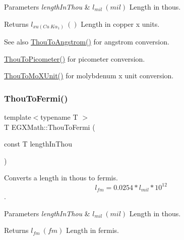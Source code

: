\begin{DoxyParams}{Parameters}
{\em length\+In\+Thou} & $ l_{mil}\ (mil)$ Length in thous. \\
\hline
\end{DoxyParams}
\begin{DoxyReturn}{Returns}
$ l_{xu(Cu\ K\alpha_1)}\ ()$ Length in copper x units. 
\end{DoxyReturn}
\begin{DoxySeeAlso}{See also}
\mbox{\hyperlink{group___e_g_x_math-_conversions-_length_conversions-_imperial-_thou-_non-_s_i_ga5d852bdec8556e4b6bde1445f5f74a20}{Thou\+To\+Angstrom()}} for angstrom conversion. 

\mbox{\hyperlink{group___e_g_x_math-_conversions-_length_conversions-_imperial-_thou-_s_i_gabc7a92b07f617bdf0ac0249d34c4aa4c}{Thou\+To\+Picometer()}} for picometer conversion. 

\mbox{\hyperlink{group___e_g_x_math-_conversions-_length_conversions-_imperial-_thou-_non-_s_i_ga3eb765800fa51e529878bdae4e997763}{Thou\+To\+Mo\+X\+Unit()}} for molybdenum x unit conversion. 
\end{DoxySeeAlso}
\mbox{\label{group___e_g_x_math-_conversions-_length_conversions-_imperial-_thou-_non-_s_i_ga4a134cf9b956cd51e579dc65b4fd7774}} 
\subsubsection{\texorpdfstring{Thou\+To\+Fermi()}{ThouToFermi()}}
{\footnotesize\ttfamily template$<$typename T $>$ \\
T E\+G\+X\+Math\+::\+Thou\+To\+Fermi (\begin{DoxyParamCaption}\item[{const T}]{length\+In\+Thou }\end{DoxyParamCaption})}



Converts a length in thous to fermis. \[ l_{fm}=0.0254 * l_{mil} * 10^{12} \]. 


\begin{DoxyParams}{Parameters}
{\em length\+In\+Thou} & $ l_{mil}\ (mil)$ Length in thous. \\
\hline
\end{DoxyParams}
\begin{DoxyReturn}{Returns}
$ l_{fm}\ (fm)$ Length in fermis. 
\end{DoxyReturn}
\mbox{\label{group___e_g_x_math-_conversions-_length_conversions-_imperial-_thou-_non-_s_i_ga7f43c9a1cbb845911bdcbbbe388347a1}} 
